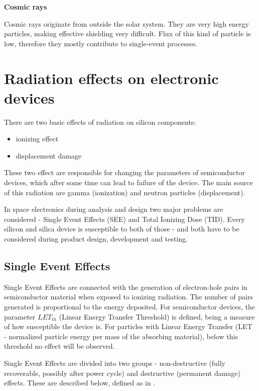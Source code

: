     \bigskip \textbf{Cosmic rays}

    Cosmic rays originate from outside the solar system. They are very high energy particles, making effective shielding very difficult. Flux of this kind of particle is low, therefore they mostly contribute to single-event processes.

\section{Radiation effects on electronic devices}
    There are two basic effects of radiation on silicon components:
    \begin{itemize}
        \item ionizing effect
        \item displacement damage
    \end{itemize}

    These two effect are responsible for changing the parameters of semiconductor devices, which after some time can lead to failure of the device. The main source of this radiation are gamma (ionization) and neutron particles (displacement).

    In space electronics during analysis and design two major problems are considered - Single Event Effects (SEE) and Total Ionizing Dose (TID). Every silicon and silica device is susceptible to both of those - and both have to be considered during product design, development and testing.

    \subsection{Single Event Effects}
        Single Event Effects are connected with the generation of electron-hole pairs in semiconductor material when exposed to ionizing radiation. The number of pairs generated is proportional to the energy deposited. For semiconductor devices, the parameter $LET_{th}$ (Linear Energy Transfer Threshold) is defined, being a measure of how susceptible the device is. For particles with Linear Energy Transfer (LET - normalized particle energy per mass of the absorbing material), below this threshold no effect will be observed.

        Single Event Effects are divided into two groups - non-destructive (fully recoverable, possibly after power cycle) and destructive (permanent damage) effects. These are described below, defined as in \cite{ECSS_Q_ST_60_15C}.

